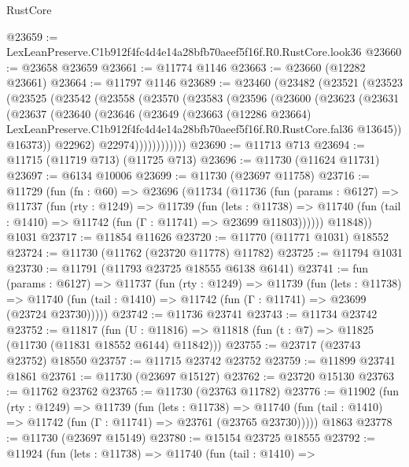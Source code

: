 \begin{lexlean}{RustCore}
\begin{coremodule}
@23659 := LexLeanPreserve.C1b912f4fc4d4e14a28bfb70aeef5f16f.R0.RustCore.look36
@23660 := @23658 @23659
@23661 := @11774 @1146
@23663 := @23660 (@12282 @23661)
@23664 := @11797 @1146
@23689 := @23460
    (@23482
      (@23521
        (@23523
          (@23525
            (@23542
              (@23558
                (@23570
                  (@23583
                    (@23596
                      (@23600
                        (@23623
                          (@23631
                            (@23637
                              (@23640
                                (@23646
                                  (@23649
                                    (@23663
                                      (@12286 @23664)
                                      LexLeanPreserve.C1b912f4fc4d4e14a28bfb70aeef5f16f.R0.RustCore.fal36
                                      @13645))
                                  @16373))
                              @22962)
                            @22974))))))))))))
@23690 := @11713 @713
@23694 := @11715 (@11719 @713) (@11725 @713)
@23696 := @11730 (@11624 @11731)
@23697 := @6134 @10006
@23699 := @11730 (@23697 @11758)
@23716 := @11729
    (fun (fn : @60) =>
    @23696
      (@11734
        (@11736
          (fun (params : @6127) =>
          @11737
            (fun (rty : @1249) =>
            @11739
              (fun (lets : @11738) =>
              @11740 (fun (tail : @1410) => @11742 (fun (Γ : @11741) => @23699 @11803))))))
        @11848))
    @1031
@23717 := @11854 @11626
@23720 := @11770 (@11771 @1031) @18552
@23724 := @11730 (@11762 (@23720 @11778) @11782)
@23725 := @11794 @1031
@23730 := @11791 (@11793 @23725 @18555 @6138 @6141)
@23741 := fun (params : @6127) =>
  @11737
    (fun (rty : @1249) =>
    @11739
      (fun (lets : @11738) =>
      @11740 (fun (tail : @1410) => @11742 (fun (Γ : @11741) => @23699 (@23724 @23730)))))
@23742 := @11736 @23741
@23743 := @11734 @23742
@23752 := @11817
    (fun (U : @11816) => @11818 (fun (t : @7) => @11825 (@11730 (@11831 @18552 @6144) @11842)))
@23755 := @23717 (@23743 @23752) @18550
@23757 := @11715 @23742 @23752
@23759 := @11899 @23741 @1861
@23761 := @11730 (@23697 @15127)
@23762 := @23720 @15130
@23763 := @11762 @23762
@23765 := @11730 (@23763 @11782)
@23776 := @11902
    (fun (rty : @1249) =>
    @11739
      (fun (lets : @11738) =>
      @11740 (fun (tail : @1410) => @11742 (fun (Γ : @11741) => @23761 (@23765 @23730)))))
    @1863
@23778 := @11730 (@23697 @15149)
@23780 := @15154 @23725 @18555
@23792 := @11924
    (fun (lets : @11738) =>
    @11740
      (fun (tail : @1410) =>

\end{coremodule}
\end{lexlean}
